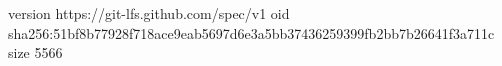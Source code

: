 version https://git-lfs.github.com/spec/v1
oid sha256:51bf8b77928f718ace9eab5697d6e3a5bb37436259399fb2bb7b26641f3a711c
size 5566
